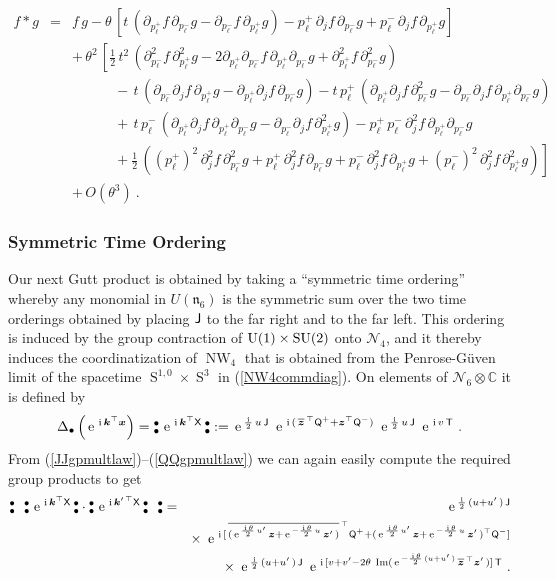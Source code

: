 \documentclass[11pt,a4paper]{article}
\DeclareMathOperator{\Sphere}{S}
\DeclareMathOperator{\NW}{NW}
\let\S\Sphere
\newcommand{\NOb}{\mbox{$\substack{\bullet\\\bullet}$}} %
\newcommand{\ii}{{\rm i}}
\newcommand{\mbf}[1]{{\boldsymbol {#1} }}
\def\ii{{\,{\rm i}\,}}
\def\T{{\sf T}}
\def\X{{\sf X}}
\def\Q{{\sf Q}}
\def\J{{\sf J}}
\def\mz{{\mbf z}}
\def\mx{{\mbf x}}
\def\mk{{\mbf k}}
\def\mfn{{\mathfrak n}}
\newcommand{\complex}{{\mathbb C}} %
\def\e{{\,\rm e}\,}
\def\bea{\begin{eqnarray}}
\def\eea{\end{eqnarray}}
\def\d{\partial}
\newcommand{\beq}{\begin{eqnarray}}
\newcommand{\eeq}{\end{eqnarray}}
\begin{document}
\begin{eqnarray}
  \label{eq:time:positionspace}
  \nonumber
  f\ast g&=&f\,g
  -\theta\,\left[
    t\,\left(\d_{p_\ell^+}f\,\d_{p_\ell^-}g
    -\d_{p_\ell^-}f\,\d_{p_\ell^+}g\right)
    -p_\ell^+\,\d_j f\,\d_{p_\ell^-}g
    +p_\ell^-\,\d_j f\,\d_{p_\ell^+}g
  \right]\\\nonumber
  &&+\,\theta^2\,\left[
  \mbox{$\frac12$}\,t^2\,\left(\d_{p_\ell^-}^2f\,\d_{p_\ell^+}^2g
  -2\d_{p_\ell^+}\d_{p_\ell^-}f\,\d_{p_\ell^+}\d_{p_\ell^-}g
  +\d_{p_\ell^+}^2f\,\d_{p_\ell^-}^2g\right)\right.
  \\\nonumber&&\qquad\quad-\,t\,\left(\d_{p_\ell^-}\d_j f\,\d_{p_\ell^+}g
  -\d_{p_\ell^+}\d_j f\,\d_{p_\ell^-}g\right)
  -t\,p_\ell^+\,\left(\d_{p_\ell^+}\d_j f\,\d_{p_\ell^-}^2g
  -\d_{p_\ell^-}\d_j f\,\d_{p_\ell^+}\d_{p_\ell^-}g\right)\\
  \nonumber &&\qquad\quad
  +\,t\,p_\ell^-\,\left(\d_{p_\ell^+}\d_j f\,\d_{p_\ell^+}\d_{p_\ell^-}g
  -\d_{p_\ell^-}\d_j f\,\d_{p_\ell^+}^2g\right)
  -p_\ell^+\,p_\ell^-\,\d_j^2f\,\d_{p_\ell^+}\d_{p_\ell^-}g
  \\ \nonumber &&\qquad\quad
  +\left.\mbox{$\frac12$}\,\left((p_\ell^+)^2\,\d_j^2f\,\d_{p_\ell^-}^2g
  +p_\ell^+\,\d_j^2f\,\d_{p_\ell^-}g
  +p_\ell^-\,\d_j^2f\,\d_{p_\ell^+}g
  +(p_\ell^-)^2\,\d_j^2f\,\d_{p_\ell^+}^2g\right)
  \right]\\&&+\,O\left(\theta^3\right) \ . 
\end{eqnarray}

\subsubsection{Symmetric Time Ordering\label{TSOP}}

Our next Gutt product is obtained by taking a ``symmetric time
ordering'' whereby any monomial in $U(\mfn_6)$ is the symmetric sum
over the two time orderings obtained by placing $\J$ to the far right
and to the far left. This ordering is induced by the group contraction of
${\rm U}(1)\times{\rm SU}(2)$ onto $\mathcal{N}_4$, and it thereby
induces the coordinatization of $\NW_4$ that is obtained from the
Penrose-G\"uven limit of the spacetime $\S^{1,0}\times\S^3$ in
(\ref{NW4commdiag}). On elements of $\mathcal{N}_6\otimes\complex$ it
is defined by
\beq
\Delta_\bullet\left(\e^{\ii\mk^\top\mx}\right)=
\NOb\,\e^{\ii\mk^\top\X}\,\NOb:=\e^{\frac\ii2\,u\,\J}~
\e^{\ii(\,\overline{\mz}^{\,\top}\Q^+
+\mz^\top\Q^-)}~\e^{\frac\ii2\,u\,\J}~\e^{\ii v\,\T} \ .
\label{TOsymgpprods}\eeq
From (\ref{JJgpmultlaw})--(\ref{QQgpmultlaw}) we can again easily
compute the required group products to get
\bea
\NOb~~\NOb\,\e^{\ii\mk^\top\X}\,\NOb\cdot\NOb\,\e^{\ii\mk^{\prime\,\top}\X}
\,\NOb~~\NOb&=&\e^{\frac\ii2\,(u+u'\,)\,\J}\nonumber\\&&\times~
\e^{\ii[\,\overline{(\e^{\frac{\ii\theta}2\,u'}\,\mz+
\e^{-\frac{\ii\theta}2\,u}\,\mz'\,)}^{\,\top}
\Q^++(\e^{\frac{\ii\theta}2\,u'}\,\mz+
\e^{-\frac{\ii\theta}2\,u}\,\mz'\,)^\top\Q^-]}
\nonumber\\&&\times~\e^{\frac\ii2\,(u+u'\,)\,\J}~
\e^{\ii[v+v'-2\theta~{\rm Im}(\e^{-\frac{\ii\theta}2\,(u+u'\,)}\,
\overline{\mz}^{\,\top}\mz'\,)]\,\T} \ .
\label{TOsymgpprodexpl}\eea
\end{document}
